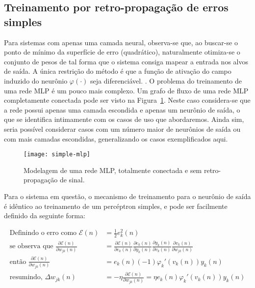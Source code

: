 \subsection{Treinamento por retro-propagação de erros simples}

Para sistemas com apenas uma camada neural, observa-se que, ao buscar-se o
ponto de mínimo da superfície de erro (quadrático), naturalmente otimiza-se o
conjunto de pesos de tal forma que o sistema consiga mapear a entrada nos
alvos de saída. A única restrição do método é que a função de ativação do
campo induzido do neurônio $\varphi(\cdot)$ seja diferenciável.
\cite{rosenblatt}. O problema do treinamento de uma rede MLP é um pouco mais
complexo. Um grafo de fluxo de uma rede MLP completamente conectada pode ser
visto na Figura~\ref{fig:simple-mlp}. Neste caso considera-se que a rede
possui apenas uma camada escondida e apenas um neurônio de saída, o que se
identifica intimamente com os casos de uso que abordaremos. Ainda sim, seria
possível considerar casos com um número maior de neurônios de saída ou com
mais camadas escondidas, generalizando os casos exemplificados aqui.

\begin{figure}
\begin{center}
\texttt{[image: simple-mlp]}
\end{center}
\caption{Modelagem de uma rede MLP, totalmente conectada e sem
retro-propagação de sinal.}
\label{fig:simple-mlp}
\end{figure}

Para o sistema em questão, o mecanismo de treinamento para o neurônio de saída
é idêntico ao treinamento de um percéptron simples, e pode ser facilmente
definido da seguinte forma:

\begin{align}
\text{Definindo o erro como } \mathcal{E}(n) &= \frac{1}{2}e_{k}^{2}(n)
\label{eq:error-def} \\
\text{se observa que } \frac{\partial\mathcal{E}(n)}{\partial
w_{jk}(n)} &= \frac{\partial\mathcal{E}(n)}{\partial e_k(n)} \frac{\partial
e_k(n)}{\partial y_k(n)} \frac{\partial y_k(n)}{\partial v_k(n)}
\frac{\partial v_k(n)}{\partial w_{jk}(n)} \label{eq:partials} \\
\text{ent\~{a}o } \frac{\partial\mathcal{E}(n)}{\partial
w_{jk}(n)} &= e_k(n)(-1)\varphi_{k}'(v_{k}(n))y_{k}(n)
\label{eq:partials-solution} \\
\text{resumindo, } \Delta w_{jk}(n) &=
-\eta\frac{\partial\mathcal{E}(n)}{\partial w_{jk}(n)} = \eta
e_{k}(n)\varphi_{k}'(v_{k}(n))y_{k}(n)
\end{align}

